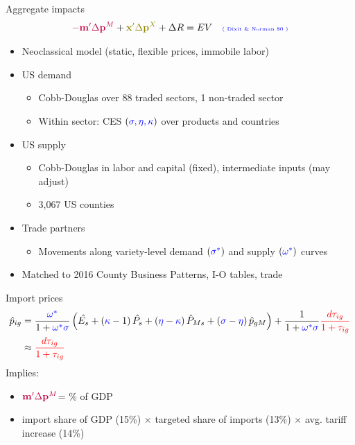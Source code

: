 \documentclass[11pt,notes=hide,aspectratio=169]{beamer}
\begin{document}
\begin{frame}{Aggregate impacts}
\begin{align*}
	{\color{purple}-\mathbf{m}'\Delta\mathbf{p}^{M}}+{\color{olive}\mathbf{x}'\Delta\mathbf{p}^{X}}+\Delta R=EV \quad {\text{\tiny\color{blue} ( Dixit \& Norman 80 )}}
\end{align*}
\begin{itemize}
	\item Neoclassical model (static, flexible prices, immobile labor)
	\item US demand
	\begin{itemize}
		\item Cobb-Douglas over 88 traded sectors, 1 non-traded sector
		\item Within sector: CES $({\color{blue}\sigma,\eta,\kappa})$ over products and countries
	\end{itemize}
	\item US supply
	\begin{itemize}
		\item Cobb-Douglas in labor and capital (fixed), intermediate inputs (may adjust)
		\item 3,067 US counties
	\end{itemize}
	\item Trade partners
	\begin{itemize}
		\item Movements along variety-level demand $({\color{blue}\sigma^{*}})$ and supply $({\color{blue}\omega^{*}})$ curves
	\end{itemize}
	\item Matched to 2016 County Business Patterns, I-O tables, trade 
\end{itemize}
\end{frame}
\begin{frame}{Import prices}
\begin{align*}
	\hat{p}_{ig}&=\frac{{\color{blue}\omega^{*}}}{1+{\color{blue}\omega^{*}\sigma}}\left(\hat{E_{s}}+\left({\color{blue}\kappa}-1\right)\hat{P_{s}}+\left({\color{blue}\eta}-{\color{blue}\kappa}\right)\hat{P}_{Ms}+\left({\color{blue}\sigma}-{\color{blue}\eta}\right)\hat{p}_{gM}\right)+\frac{1}{1+{\color{blue}\omega^{*}\sigma}}{\color{red}\frac{d\tau_{ig}}{1+\tau_{ig}}} \\
	&\approx{\color{red}\frac{d\tau_{ig}}{1+\tau_{ig}}}
\end{align*}
Implies:
\begin{itemize}
	\item ${\color{purple}\mathbf{m}'\Delta\mathbf{p}^{M}}$= \unskip\% of GDP
	\item import share of GDP (15\%) $\times$ targeted share of imports (13\%) $\times$ avg. tariff increase (14\%)
\end{itemize}
\end{frame}
\end{document}
